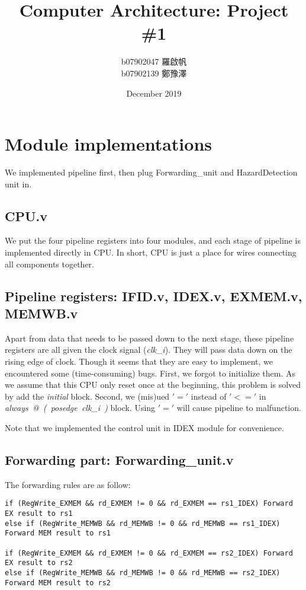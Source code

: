 \documentclass{article}
\title{Computer Architecture: Project \#1}
\author{b07902047 羅啟帆\\ b07902139 鄭豫澤}
\date{December 2019}
\begin{document}
\maketitle


\section{Module implementations}
We implemented pipeline first, then plug Forwarding\_unit and HazardDetection unit in.

\subsection{CPU.v}
We put the four pipeline registers into four modules, and each stage of pipeline is implemented directly in CPU. In short, CPU is just a place for wires connecting all components together.

\subsection{Pipeline registers: IFID.v, IDEX.v, EXMEM.v, MEMWB.v}
Apart from data that needs to be passed down to the next stage, these pipeline registers are all given the clock signal (\textit{clk\_i}). They will pass data down on the rising edge of clock. Though it seems that they are easy to implement, we encountered some (time-consuming) bugs. First, we forgot to initialize them. As we assume that this CPU only reset once at the beginning, this problem is solved by add the \textit{initial} block. Second, we (mis)ued $'='$ instead of $'<='$ in \textit{always\ @\ (\ posedge\ clk\_i\ )} block. Using $'='$ will cause pipeline to malfunction.

Note that we implemented the control unit in IDEX module for convenience.

\subsection{Forwarding part: Forwarding\_unit.v}
The forwarding rules are as follow:

\begin{lstlisting}[language=text, caption=Rules, xleftmargin=10pt, xrightmargin=10pt, mathescape=true]
if (RegWrite_EXMEM && rd_EXMEM != 0 && rd_EXMEM == rs1_IDEX) Forward EX result to rs1
else if (RegWrite_MEMWB && rd_MEMWB != 0 && rd_MEMWB == rs1_IDEX) Forward MEM result to rs1

if (RegWrite_EXMEM && rd_EXMEM != 0 && rd_EXMEM == rs2_IDEX) Forward EX result to rs2
else if (RegWrite_MEMWB && rd_MEMWB != 0 && rd_MEMWB == rs2_IDEX) Forward MEM result to rs2\end{lstlisting}
\end{document}

